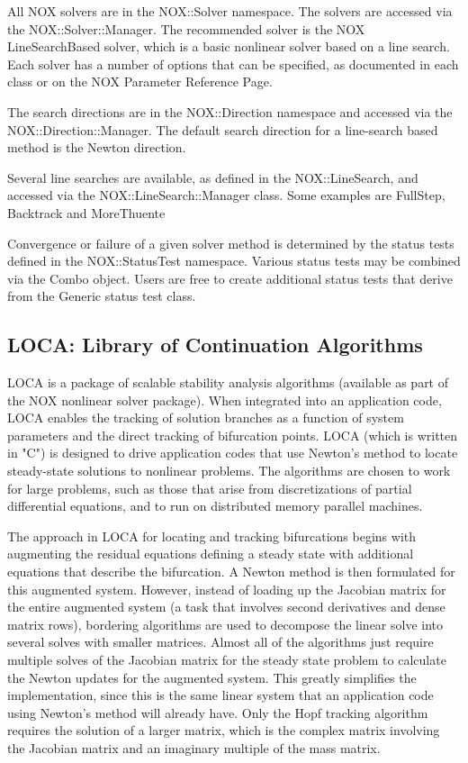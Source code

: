 \documentclass[12pt,relax]{TrilinosOverview}
\begin{document}
All NOX solvers are in the NOX::Solver namespace. The solvers are
accessed via the NOX::Solver::Manager. The recommended solver is 
the NOX LineSearchBased solver, which is a basic nonlinear solver 
based on a line search.
Each solver has a number of options that can be specified, as 
documented in each class or on the NOX Parameter
Reference Page. 

The search directions are in the NOX::Direction namespace and 
accessed via the NOX::Direction::Manager. The
default search direction for a line-search based method is the Newton direction. 

Several line searches are available, as defined in the 
NOX::LineSearch, and accessed via the
NOX::LineSearch::Manager class. Some examples are 
FullStep, Backtrack and MoreThuente

Convergence or failure of a given solver method is determined by the 
status tests defined in the NOX::StatusTest namespace. Various status
tests may be combined via the Combo object. Users
are free to create additional status tests that derive from the
Generic status test class. 

\subsection{LOCA: Library of Continuation Algorithms}


LOCA is a package of scalable stability analysis algorithms (available as part of 
the NOX nonlinear solver package). When integrated into an application code, 
LOCA enables the tracking of solution branches as a function of system 
parameters and the direct tracking of bifurcation points. LOCA (which is 
written in "C") is designed to drive application codes that use Newton's 
method to locate steady-state solutions to nonlinear problems. The algorithms 
are chosen to work for large problems, such as those that arise from 
discretizations of partial differential equations, and to run on distributed
 memory parallel machines.  

The approach in LOCA for locating and tracking bifurcations begins with augmenting 
the residual equations defining a steady state with additional equations that 
describe the bifurcation. A Newton method is then formulated for this augmented 
system.  However, instead of loading up the Jacobian matrix for the entire 
augmented system (a task that involves second derivatives and dense matrix rows), 
bordering algorithms are used to decompose the linear solve into several solves 
with smaller matrices. Almost all of the algorithms just require multiple solves 
of the Jacobian matrix for the steady state problem to calculate the Newton 
updates for the augmented system. This greatly simplifies the implementation, 
since this is the same linear system that an application code using Newton's 
method will already have. Only the Hopf tracking algorithm requires 
the solution of a larger matrix, which is the complex matrix involving the 
Jacobian matrix and an imaginary multiple of the mass matrix. 
\end{document}
